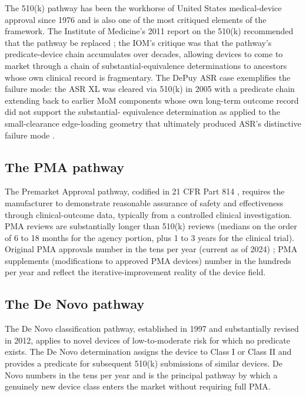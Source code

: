 The 510(k) pathway has been the workhorse of United States
medical-device approval since 1976 and is also one of the most
critiqued elements of the framework. The Institute of Medicine's
2011 report on the 510(k) recommended that the pathway be
replaced \cite{paper:v6c12-iom-510k-2011}; the IOM's critique was
that the pathway's predicate-device chain accumulates over
decades, allowing devices to come to market through a chain of
substantial-equivalence determinations to ancestors whose own
clinical record is fragmentary. The DePuy ASR case exemplifies
the failure mode: the ASR XL was cleared via 510(k) in 2005 with
a predicate chain extending back to earlier MoM components whose
own long-term outcome record did not support the substantial-
equivalence determination as applied to the small-clearance
edge-loading geometry that ultimately produced ASR's distinctive
failure mode \cite{paper:v6c12-cohen-mom-bmj-2012,
paper:v6c12-zaaijer-510k-2013,
paper:v6c12-makary-recalls-2017}.

\subsection{The PMA pathway}

The Premarket Approval pathway, codified in 21 CFR Part 814
\cite{law:v6c12-21cfr-814}, requires the manufacturer to
demonstrate reasonable assurance of safety and effectiveness
through clinical-outcome data, typically from a controlled
clinical investigation. PMA reviews are substantially longer than
510(k) reviews (medians on the order of 6 to 18 months for the
agency portion, plus 1 to 3 years for the clinical trial).
Original PMA approvals number in the tens per year (current as of
2024) \cite{web:v6c12-fda-pma-database-2024}; PMA supplements
(modifications to approved PMA devices) number in the hundreds per
year and reflect the iterative-improvement reality of the device
field.

\subsection{The De Novo pathway}

The De Novo classification pathway, established in 1997 and
substantially revised in 2012, applies to novel devices of
low-to-moderate risk for which no predicate exists. The De Novo
determination assigns the device to Class I or Class II and
provides a predicate for subsequent 510(k) submissions of similar
devices. De Novo numbers in the tens per year and is the principal
pathway by which a genuinely new device class enters the market
without requiring full PMA.

